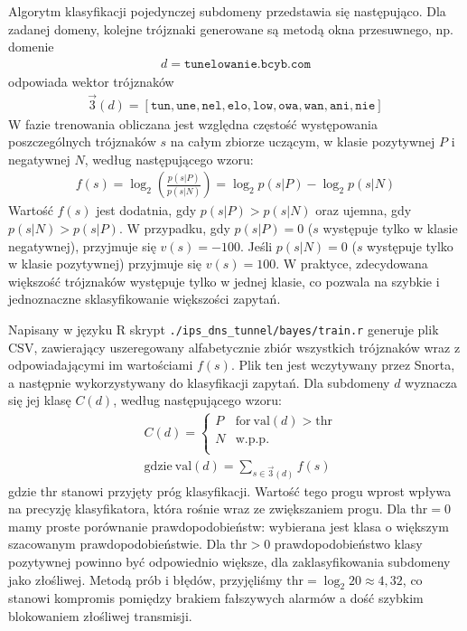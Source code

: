 \documentclass{eiti-raport}
\begin{document}
Algorytm klasyfikacji pojedynczej subdomeny przedstawia się następująco. Dla zadanej domeny, kolejne trójznaki generowane są metodą okna przesuwnego, np. domenie
\begin{align*}
d = \texttt{tunelowanie.bcyb.com}
\end{align*}
odpowiada wektor trójznaków 
\begin{align*}
\vec{3}(d) = \left[ \texttt{tun}, \texttt{une}, \texttt{nel}, \texttt{elo}, \texttt{low}, \texttt{owa}, \texttt{wan}, \texttt{ani}, \texttt{nie} \right]
\end{align*}
W fazie trenowania obliczana jest względna częstość występowania poszczególnych trójznaków $s$ na całym zbiorze uczącym, w klasie pozytywnej $P$ i negatywnej $N$, według następującego wzoru:
\begin{align*}
f(s) = \log_2 \left( \frac{p\left(s|P\right)}{p\left(s|N\right)} \right) = \log_2 p\left(s|P\right) - \log_2 p\left(s|N\right) 
\end{align*}
Wartość $f(s)$ jest dodatnia, gdy $p(s|P) > p(s|N)$ oraz ujemna, gdy $p(s|N) > p(s|P)$. W przypadku, gdy $p(s|P) = 0$ ($s$ występuje tylko w klasie negatywnej), przyjmuje się $v(s) = -100$. Jeśli $p(s|N) = 0$ ($s$ występuje tylko w klasie pozytywnej) przyjmuje się $v(s) = 100$. W praktyce, zdecydowana większość trójznaków występuje tylko w jednej klasie, co pozwala na szybkie i jednoznaczne sklasyfikowanie większości zapytań. 

Napisany w języku R skrypt \texttt{./ips\_dns\_tunnel/bayes/train.r} generuje plik CSV, zawierający uszeregowany alfabetycznie zbiór wszystkich trójznaków wraz z odpowiadającymi im wartościami $f(s)$. Plik ten jest wczytywany przez Snorta, a następnie wykorzystywany do klasyfikacji zapytań. Dla subdomeny $d$ wyznacza się jej klasę $C(d)$, według następującego wzoru:
\begin{align*}
& C(d) = \begin{cases}
	P & \text{for} \ \text{val}(d) > \textrm{thr} \\ 
	N & \text{w.p.p.} \\
\end{cases}
\\ & \textrm{gdzie} \ \text{val}(d) = \sum_{s \in \vec{3}(d)} f(s)
\end{align*}
gdzie $\textrm{thr}$ stanowi przyjęty próg klasyfikacji. Wartość tego progu wprost wpływa na precyzję klasyfikatora, która rośnie wraz ze zwiększaniem progu. Dla $\text{thr} = 0$ mamy proste porównanie prawdopodobieństw: wybierana jest klasa o większym szacowanym prawdopodobieństwie. Dla $\text{thr} > 0$ prawdopodobieństwo klasy pozytywnej powinno być odpowiednio większe, dla zaklasyfikowania subdomeny jako złośliwej. Metodą prób i błędów, przyjęliśmy $\text{thr} = \log_2 20 \approx 4,32$, co stanowi kompromis pomiędzy brakiem fałszywych alarmów a dość szybkim blokowaniem złośliwej transmisji. 
\end{document}
